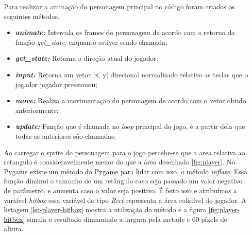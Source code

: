 Para realizar a animação do personagem principal no código foram criados os seguintes métodos.

\begin{itemize}
    \item \textit{\textbf{animate:}} Intercala os frames do personagem de acordo com o retorno da função \textit{get\_state:} enquanto estiver sendo chamada;
    \item \textit{\textbf{get\_state:}} Retorna a direção atual do jogador;
    \item \textit{\textbf{input:}}  Retorna um vetor [x, y] direcional normalizado relativo as teclas que o jogador jogador pressionou;
    \item \textit{\textbf{move:}} Realiza a movimentação do personagem de acordo com o vetor obtido anteriormente;
    \item \textit{\textbf{update:}} Função que é chamada no \textit{loop} principal do jogo, é a partir dela que todas as anteriores são chamadas;

\end{itemize}



Ao carregar o sprite do personagem para o jogo percebe-se que a area relativa ao retangulo é consideravelmente menor do que a área desenhada \ref{fig:player}.
No Pygame existe um método do Pygame para lidar com isso, o método \textit{inflate}. Essa função diminui o tamanho de um retângulo caso seja passado um valor negativo de parâmetro, e aumenta caso o valor seja positivo. É feito isso e atribuímos a variável \textit{hitbox} essa variável do tipo \textit{Rect} representa a área colidível do jogador. A listagem \ref{lst-player-hitbox} mostra a utilização do método e a figura \ref{fig:player-hitbox} simula o resultado diminuindo a largura pela metade e 60 píxels de altura.

